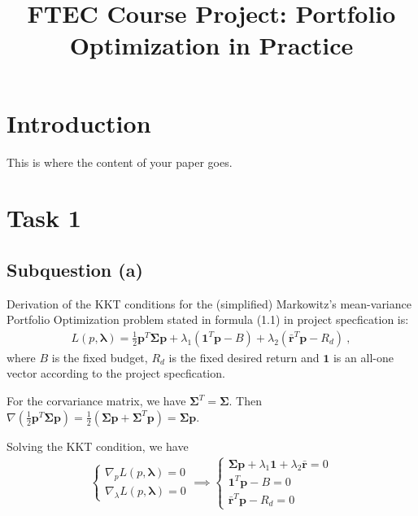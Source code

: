 \documentclass[12pt]{ftec2101}
\title{FTEC Course Project: Portfolio Optimization in Practice}
\newcommand{\matr}[1]{\mathbf{#1}}
\newcommand{\vect}[1]{\mathbf{#1}}
\begin{document}
\maketitle


\section{Introduction}

This is where the content of your paper goes.

\section{Task 1}
\subsection{Subquestion (a)}
Derivation of the KKT conditions for the (simplified) Markowitz's mean-variance Portfolio Optimization problem stated in formula (1.1) in project specfication is:
\begin{align}
    L(p,\boldsymbol{\lambda}) = \frac{1}{2}\vect{p}^T\matr{\Sigma} \vect{p} + \lambda_{1} (\vect{1}^T \vect{p}-B) +\lambda_{2} (\bar{\vect{r}}^T \vect{p}-R_{d})\ ,
\end{align}
where $B$ is the fixed budget, $R_d$ is the fixed desired return and $\vect{1}$ is an all-one vector according to the project specfication.

\noindent
For the corvariance matrix, we have $\matr{\Sigma}^T = \matr{\Sigma}$. Then $\nabla \left(\frac{1}{2}\vect{p}^T \matr{\Sigma} \vect{p}\right) = \frac{1}{2}(\matr{\Sigma}\vect{p}+\matr{\Sigma}^T \vect{p}) = \matr{\Sigma}\vect{p}$. 

\noindent
Solving the KKT condition, we have
\begin{align}
    \begin{cases}
        \nabla_{p} L(p,\boldsymbol{\lambda}) = 0 \\
        \nabla_{\lambda} L(p,\boldsymbol{\lambda}) = 0
    \end{cases}
    \implies
    \begin{cases}
        \matr{\Sigma}\vect{p}+\lambda_1 \vect{1} + \lambda_2 \bar{\vect{r}} = 0 \\
        \vect{1}^T \vect{p} - B = 0 \\
        \bar{\vect{r}}^T \vect{p} - R_d = 0
    \end{cases}
    \label{KKT:1}
\end{align}
\end{document}
